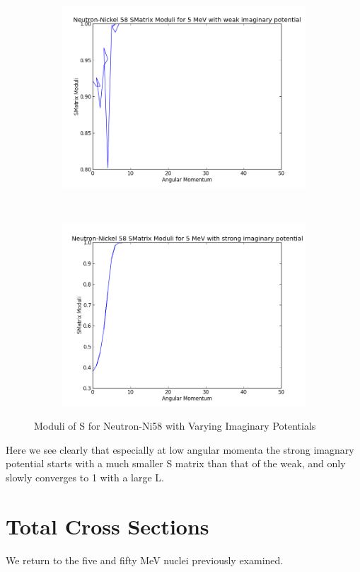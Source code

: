 \documentclass[paper=a4, fontsize=11pt]{scrartcl} %
\numberwithin{equation}{section} %
\numberwithin{figure}{section} %
\numberwithin{table}{section} %
\begin{document}
 \begin{figure}[hbt!]
        \centering
        \begin{subfigure}[b!]{0.45\textwidth}
                \includegraphics[width=\textwidth]{NeutronWeaks.png}
        \end{subfigure}%
        ~ %
\quad
        \begin{subfigure}[b!]{0.45\textwidth}
                \includegraphics[width=\textwidth]{NeutronStrongs.png}
        \end{subfigure}

        \caption{Moduli of S for Neutron-Ni58 with Varying Imaginary Potentials}
\end{figure}

Here we see clearly that especially at low angular momenta the strong imagnary potential starts with a much smaller S matrix than that of the weak, and only slowly converges to 1 with a large L. \\

\section{Total Cross Sections}

We return to the five and fifty MeV nuclei previously examined. 
\end{document}
